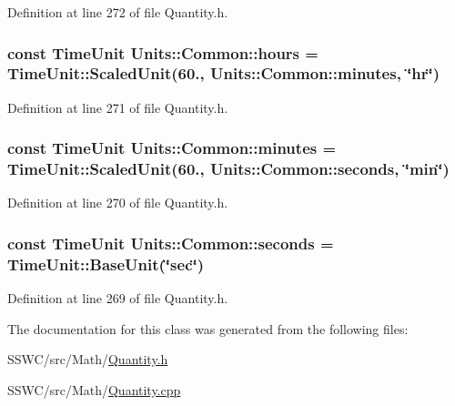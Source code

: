 Definition at line 272 of file Quantity.\+h.

\hypertarget{class_units_1_1_common_a85905b04a8c1fa4058249d06c81828c7}{
\subsubsection[{hours}]{\setlength{\rightskip}{0pt plus 5cm}const {\bf Time\+Unit} Units\+::\+Common\+::hours = {\bf Time\+Unit\+::\+Scaled\+Unit}(60., {\bf Units\+::\+Common\+::minutes}, \char`\"{}hr\char`\"{})\hspace{0.3cm}{\ttfamily [static]}}}\label{class_units_1_1_common_a85905b04a8c1fa4058249d06c81828c7}


Definition at line 271 of file Quantity.\+h.

\hypertarget{class_units_1_1_common_ae00592bb8573bd91d034a0b23f4449d6}{
\subsubsection[{minutes}]{\setlength{\rightskip}{0pt plus 5cm}const {\bf Time\+Unit} Units\+::\+Common\+::minutes = {\bf Time\+Unit\+::\+Scaled\+Unit}(60., {\bf Units\+::\+Common\+::seconds}, \char`\"{}min\char`\"{})\hspace{0.3cm}{\ttfamily [static]}}}\label{class_units_1_1_common_ae00592bb8573bd91d034a0b23f4449d6}


Definition at line 270 of file Quantity.\+h.

\hypertarget{class_units_1_1_common_a0cc948d0fded9699abb22295119fff7b}{
\subsubsection[{seconds}]{\setlength{\rightskip}{0pt plus 5cm}const {\bf Time\+Unit} Units\+::\+Common\+::seconds = {\bf Time\+Unit\+::\+Base\+Unit}(\char`\"{}sec\char`\"{})\hspace{0.3cm}{\ttfamily [static]}}}\label{class_units_1_1_common_a0cc948d0fded9699abb22295119fff7b}


Definition at line 269 of file Quantity.\+h.



The documentation for this class was generated from the following files\+:\begin{DoxyCompactItemize}
\item 
S\+S\+W\+C/src/\+Math/\hyperlink{_quantity_8h}{Quantity.\+h}\item 
S\+S\+W\+C/src/\+Math/\hyperlink{_quantity_8cpp}{Quantity.\+cpp}\end{DoxyCompactItemize}
